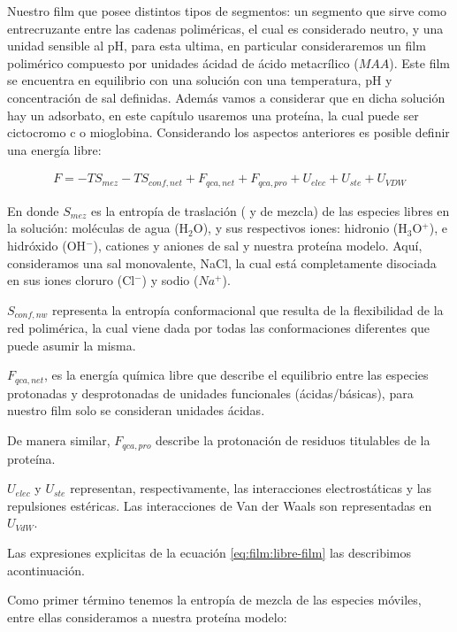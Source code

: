 Nuestro film que posee distintos tipos de segmentos: un segmento que sirve como entrecruzante entre las cadenas polim\'ericas, el cual es considerado neutro, y  una unidad sensible al pH,  para esta ultima, en particular consideraremos un film polim\'erico compuesto por unidades \'acidad de \'acido metacr\'ilico ($MAA$).
Este film  se encuentra en equilibrio con una soluci\'on con una temperatura, pH y concentraci\'on de sal definidas. Adem\'as vamos a considerar que en dicha soluci\'on hay un adsorbato, en este cap\'itulo usaremos una prote\'ina, la cual puede ser cictocromo c o mioglobina. 
Considerando los aspectos anteriores es posible definir una energ\'ia libre:

\begin{align}
 	F = -TS_{mez} -TS_{conf,net} + F_{qca,net} + F_{qca,pro} + U_{elec} + U_{ste} + U_{VDW}
 	\label{eq:film:libre-film}
\end{align}
 
\noindent En donde $S_{mez}$ es la entrop\'ia de traslaci\'on ( y de mezcla) de las especies libres en la soluci\'on: mol\'eculas de agua (H$_2$O), y sus respectivos iones:  hidronio (H$_3$O$^+$), e hidr\'oxido (OH$^- $), cationes y aniones de sal y nuestra prote\'ina modelo.
Aqu\'i, consideramos una sal monovalente, NaCl, la cual est\'a completamente disociada en sus  iones cloruro (Cl$^-$) y sodio ($Na^+$). 

$S_{conf,nw}$ representa la entrop\'ia conformacional que resulta de la flexibilidad de la red polim\'erica, la cual viene dada por todas las conformaciones diferentes que puede asumir la misma.

$F_{qca,net}$, es la energ\'ia qu\'imica libre que describe el equilibrio entre las especies protonadas y desprotonadas de unidades funcionales (\'acidas/b\'asicas), para nuestro film solo se consideran unidades \'acidas.

De manera similar, $F_{qca,pro}$ describe la protonaci\'on de residuos titulables de la prote\'ina.

$U_{elec}$ y $U_{ste}$ representan, respectivamente, las interacciones electrost\'aticas y las repulsiones est\'ericas.
Las interacciones de Van der Waals son representadas en $U_{VdW}$.


Las expresiones explicitas de la ecuaci\'on \ref{eq:film:libre-film} las describimos acontinuaci\'on.

Como primer t\'ermino tenemos la entrop\'ia de mezcla de  las especies m\'oviles, entre ellas consideramos a nuestra prote\'ina modelo:

